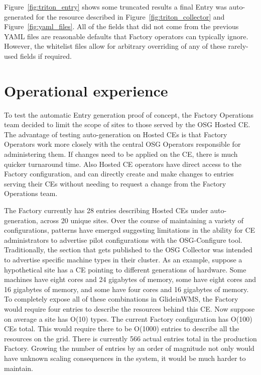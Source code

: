 \documentclass[manuscript,screen,review]{acmart}
\begin{document}
Figure~\ref{fig:triton_entry} shows some truncated results a final Entry was auto-generated for the resource described in Figure~\ref{fig:triton_collector} and Figure~\ref{fig:yaml_files}. All of the fields that did not come from the previous YAML files are reasonable defaults that Factory operators can typically ignore. However, the whitelist files allow for arbitrary overriding of any of these rarely-used fields if required.

\section{Operational experience}
\label{exp}
To test the automatic Entry generation proof of concept, the Factory Operations team decided to limit the scope of sites to those served by the OSG Hosted CE. The advantage of testing auto-generation on Hosted CEs is that Factory Operators work more closely with the central OSG Operators responsible for administering them. If changes need to be applied on the CE, there is much quicker turnaround time. Also Hosted CE operators have direct access to the Factory configuration, and can directly create and make changes to entries serving their CEs without needing to request a change from the Factory Operations team.

The Factory currently has 28 entries describing Hosted CEs under auto-generation, across 20 unique sites. Over the course of maintaining a variety of configurations, patterns have emerged suggesting limitations in the ability for CE administrators to advertise pilot configurations with the OSG-Configure tool. Traditionally, the section that gets published to the OSG Collector was intended to advertise specific machine types in their cluster. As an example, suppose a hypothetical site has a CE pointing to different generations of hardware. Some machines have eight cores and 24 gigabytes of memory, some have eight cores and 16 gigabytes of memory, and some have four cores and 16 gigabytes of memory. To completely expose all of these combinations in GlideinWMS, the Factory would require four entries to describe the resources behind this CE. Now suppose on average a site has O(10) types. The current Factory configuration has O(100) CEs total. This would require there to be O(1000) entries to describe all the resources on the grid. There is currently 566 actual entries total in the production Factory. Growing the number of entries by an order of magnitude not only would have unknown scaling consequences in the system, it would be much harder to maintain.
\end{document}

